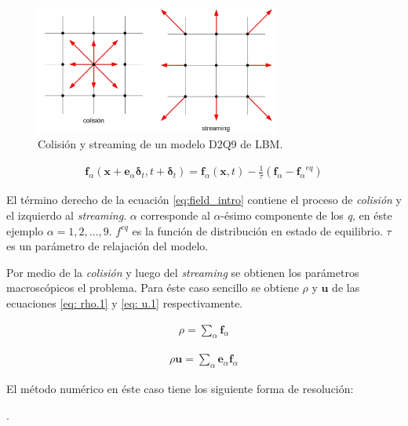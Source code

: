\begin{figure}[h!]
	\centering
	\includegraphics[width=8cm]{grilla_stre_colli_intro.png}
	\caption{Colisión y streaming de un modelo D2Q9 de LBM.}
	\label{fig:grilla_D2Q9}
\end{figure}


\begin{align}
	\mathbf{f}_{\alpha} (\mathbf{x} + \mathbf{e}_{\alpha} \mathbf{\delta}_{t}, t + \mathbf{\delta}_{t})  = \mathbf{f}_{\alpha} (\mathbf{x}, t) - \frac{1}{\tau} (\mathbf{f}_{\alpha} - {\mathbf{f}_{\alpha}}^{eq})
	\label{eq:field_intro} 
\end{align}

El término derecho de la ecuación \ref{eq:field_intro} contiene el proceso de \textit{colisión} y el izquierdo al \textit{streaming}. $\alpha$ corresponde al  $\alpha$-ésimo componente de los \textit{q}, en éste ejemplo $\alpha = 1, 2, ...,9$. $f^{eq}$ es la función de distribución en estado de equilibrio. $\tau$ es un parámetro de relajación del modelo. 

Por medio de la \textit{colisión} y luego del \textit{streaming} se obtienen los parámetros macroscópicos el problema. Para éste caso sencillo se obtiene $\rho$ y $\mathbf{u}$ de las ecuaciones \ref{eq: rho.1} y \ref{eq: u.1} respectivamente.

\begin{align}
	\rho = \sum_{\alpha} \mathbf{f}_{\alpha}
	\label{eq: rho.1}
\end{align}

\begin{align}
	\rho \mathbf{u}= \sum_{\alpha} \mathbf{e}_{\alpha} \mathbf{f}_{\alpha}
	\label{eq: u.1}
\end{align}

El método numérico en éste caso tiene los siguiente forma de resolución:
\newline
{\scriptsize

}
.
\newline 
\newline 

